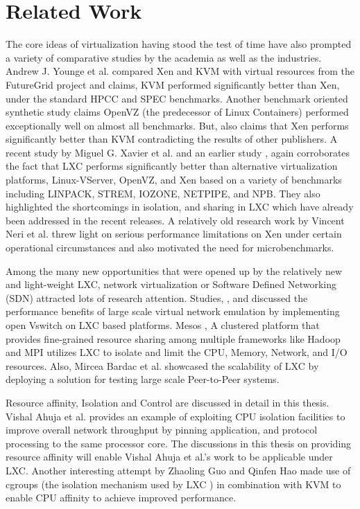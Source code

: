 \chapter{Related Work}

The core ideas of virtualization having stood the test of time have also prompted a variety of comparative studies by the academia as well as the industries.
Andrew J. Younge et al. \cite{younge2011analysis} compared Xen and KVM with virtual resources from the FutureGrid project \cite{futuregrid} and claims, KVM performed significantly better than Xen, under the standard HPCC and SPEC  benchmarks. Another benchmark oriented synthetic study \cite{synthetic} claims OpenVZ (the predecessor of Linux Containers) performed exceptionally well on almost all benchmarks. But, also claims that Xen performs significantly better than KVM contradicting the results of other publishers.
A recent study by Miguel G. Xavier et al. \cite{container1} and an earlier study \cite{container2}, again corroborates the fact that LXC performs significantly better than alternative virtualization platforms, Linux-VServer, OpenVZ, and Xen based on a variety of benchmarks including LINPACK, STREM, IOZONE, NETPIPE, and NPB. They also highlighted the shortcomings in isolation, and sharing in LXC which have already been addressed in the recent releases.
A relatively old research work by Vincent Neri et al. \cite{fourcomp} threw light on serious performance limitations on Xen under certain operational circumstances and also motivated the need for microbenchmarks.

Among the many new opportunities that were opened up by the relatively new and light-weight LXC, network virtualization or Software Defined Networking (SDN) attracted lots of research attention. Studies, \cite{sdn1}, and \cite{sdn2} discussed the performance benefits of large scale virtual network emulation by implementing open Vswitch \cite{openvswitch} on LXC based platforms. 
Mesos \cite{mesos} , A clustered platform that provides fine-grained resource sharing among multiple frameworks like Hadoop \cite{hadoop} and MPI \cite{mpi} utilizes LXC to isolate and limit the CPU, Memory, Network, and I/O resources. Also, Mircea Bardac et al. \cite{peer} showcased the scalability of LXC by deploying a solution for testing large scale Peer-to-Peer systems.

Resource affinity, Isolation and Control are discussed in detail in this thesis. Vishal Ahuja et al. \cite{cacheaware} provides an example of exploiting CPU isolation facilities to improve overall network throughput by pinning application, and protocol processing to the same processor core. The discussions in this thesis on providing resource affinity will enable Vishal Ahuja et al.'s  work to be applicable under LXC.
Another interesting attempt by Zhaoling Guo and Qinfen Hao \cite{kvmaffinity} made use of cgroups (the isolation mechanism used by LXC ) in combination with KVM to enable CPU affinity to achieve improved performance.

